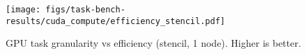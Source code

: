 \begin{figure}[t]
\centering
\texttt{[image: figs/task-bench-results/cuda\_compute/efficiency\_stencil.pdf]}
\vspace{-0.5cm}
\caption{GPU task granularity vs efficiency (stencil, 1 node). Higher is better.\label{fig:cuda-efficiency}}
\vspace{-0.05cm}
\end{figure}
